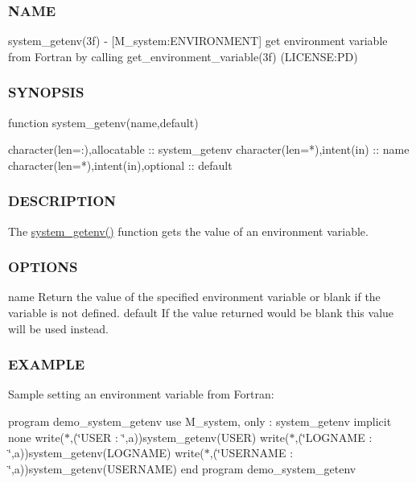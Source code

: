 \subsubsection*{N\+A\+ME}

system\+\_\+getenv(3f) -\/ \mbox{[}M\+\_\+system\+:E\+N\+V\+I\+R\+O\+N\+M\+E\+NT\mbox{]} get environment variable from Fortran by calling get\+\_\+environment\+\_\+variable(3f) (L\+I\+C\+E\+N\+SE\+:PD) 

\subsubsection*{S\+Y\+N\+O\+P\+S\+IS}

\begin{DoxyVerb}function system_getenv(name,default)

 character(len=:),allocatable         :: system_getenv
 character(len=*),intent(in)          :: name
 character(len=*),intent(in),optional :: default
\end{DoxyVerb}


\subsubsection*{D\+E\+S\+C\+R\+I\+P\+T\+I\+ON}

The \mbox{\hyperlink{namespacem__system_a0f91f973a4288ebda0e75ea0869a43af}{system\+\_\+getenv()}} function gets the value of an environment variable.

\subsubsection*{O\+P\+T\+I\+O\+NS}

name Return the value of the specified environment variable or blank if the variable is not defined. default If the value returned would be blank this value will be used instead.

\subsubsection*{E\+X\+A\+M\+P\+LE}

Sample setting an environment variable from Fortran\+:

program demo\+\_\+system\+\_\+getenv use M\+\_\+system, only \+: system\+\_\+getenv implicit none write($\ast$,\textquotesingle{}(\char`\"{}\+U\+S\+E\+R     \+: \char`\"{},a)\textquotesingle{})system\+\_\+getenv(\textquotesingle{}U\+S\+ER\textquotesingle{}) write($\ast$,\textquotesingle{}(\char`\"{}\+L\+O\+G\+N\+A\+M\+E  \+: \char`\"{},a)\textquotesingle{})system\+\_\+getenv(\textquotesingle{}L\+O\+G\+N\+A\+ME\textquotesingle{}) write($\ast$,\textquotesingle{}(\char`\"{}\+U\+S\+E\+R\+N\+A\+M\+E \+: \char`\"{},a)\textquotesingle{})system\+\_\+getenv(\textquotesingle{}U\+S\+E\+R\+N\+A\+ME\textquotesingle{}) end program demo\+\_\+system\+\_\+getenv

